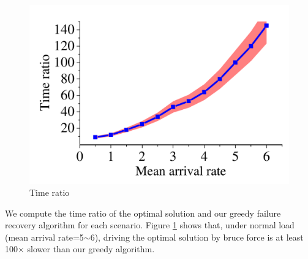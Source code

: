 \documentclass[sigconf]{acmart}
\begin{document}
\begin{appendices}
\begin{figure}[t]
\begin{center}
\includegraphics [width=0.8\columnwidth] {fig/evaluation/time-consuming.pdf}
\caption{Time ratio}
\label{sim-time}
\end{center}
\end{figure}




We compute the time ratio of the optimal solution and our greedy failure recovery algorithm for each scenario.
Figure \ref{sim-time}  shows that, under normal load (mean arrival rate=5$\sim$6), driving the optimal solution by bruce force is at least 100$\times$ slower than our greedy algorithm.
\end{appendices}






\clearpage
\end{document}
